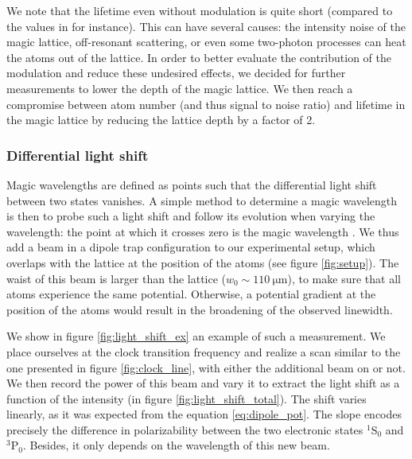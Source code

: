 \documentclass[11pt]{article}
\numberwithin{equation}{section}
\numberwithin{figure}{section}
\begin{document}
We note that the lifetime even without modulation is quite short (compared to the values in \cite{2020_heinz} for instance). This can have several causes: the intensity noise of the magic lattice, off-resonant scattering, or even some two-photon processes can heat the atoms out of the lattice. In order to better evaluate the contribution of the modulation and reduce these undesired effects, we decided for further measurements to lower the depth of the magic lattice. We then reach a compromise between atom number (and thus signal to noise ratio) and lifetime in the magic lattice by reducing the lattice depth by a factor of 2.

\subsubsection{Differential light shift}
\label{sec:stark_shift}

Magic wavelengths are defined as points such that the differential light shift between two states vanishes. A simple method to determine a magic wavelength is then to probe such a light shift and follow its evolution when varying the wavelength: the point at which it crosses zero is the magic wavelength \citep[this has been done by e.g.][]{2008_barber}. We thus add a beam in a dipole trap configuration to our experimental setup, which overlaps with the lattice at the position of the atoms (see figure \ref{fig:setup}). The waist of this beam is larger than the lattice ($w_0 \sim \SI{110}{\micro\metre}$), to make sure that all atoms experience the same potential. Otherwise, a potential gradient at the position of the atoms would result in the broadening of the observed linewidth.

We show in figure \ref{fig:light_shift_ex} an example of such a measurement. We place ourselves at the clock transition frequency and realize a scan similar to the one presented in figure \ref{fig:clock_line}, with either the additional beam on or not. We then record the power of this beam and vary it to extract the light shift as a function of the intensity (in figure \ref{fig:light_shift_total}). The shift varies linearly, as it was expected from the equation \eqref{eq:dipole_pot}. The slope encodes precisely the difference in polarizability between the two electronic states $^1$S$_0$ and $^3$P$_0$. Besides, it only depends on the wavelength of this new beam. 
\end{document}
